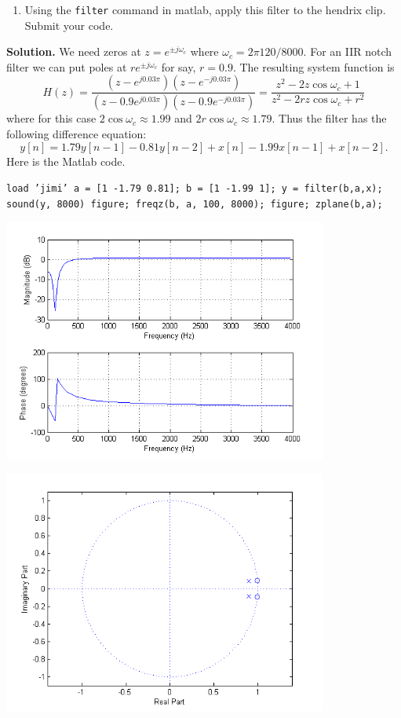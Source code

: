 \documentclass[]{siamltex}
\begin{document}
\begin{enumerate}
\begin{enumerate}
\vspace{3mm}
\item Using the \texttt{filter} command in matlab, apply this filter to the hendrix clip. Submit your code.
\end{enumerate}


\textbf{Solution.} We need zeros at $z=e^{\pm j\omega_c}$ where $\omega_c = 2 \pi 120/8000$. For an IIR notch filter we can put poles at $re^{\pm j \omega_c}$ for say, $r=0.9$. The resulting system function is 
\[ H(z)=\frac{(z-e^{j 0.03 \pi})(z-e^{-j0.03 \pi}) }{(z-0.9 e^{j 0.03 \pi})(z-0.9 e^{-j0.03 \pi}) }=\frac{z^2-2z \cos \omega_c +1 }{z^2 - 2rz \cos \omega_c + r^2} \]
where for this case $2 \cos \omega_c \approx 1.99$ and $2r \cos \omega_c \approx 1.79$. Thus the filter has the following difference equation:
\[ y[n] = 1.79 y[n-1] - 0.81 y[n-2] + x[n] - 1.99 x[n -1] + x[n-2]. \]
Here is the Matlab code.

\texttt{load 'jimi' \newline
a = [1 -1.79 0.81]; b = [1 -1.99 1]; \newline
y = filter(b,a,x);\newline
sound(y, 8000) \newline
figure; freqz(b, a, 100, 8000); \newline
figure; zplane(b,a); 
}

\includegraphics[width=0.8\textwidth]{notch_approx_freq_response.png} 

\includegraphics[width=0.8\textwidth]{notch_pole_zero.png}


\end{enumerate}
\end{document}
